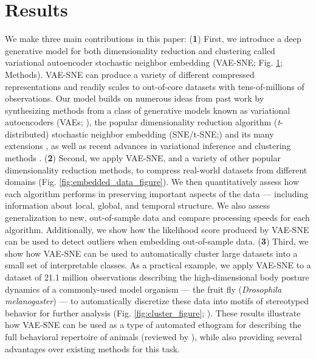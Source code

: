 \documentclass[11pt,a4paper,twoside]{book}
\begin{document}
\begin{doublespace}
\begin{figure}[!htb]
\label{fig:vaesne_figure} %

\end{figure}

\section{Results}
We make three main contributions in this paper: (\textbf{1}) First, we introduce a deep generative model for both dimensionality reduction and clustering called variational autoencoder stochastic neighbor embedding (VAE-SNE; Fig. \ref{fig:vaesne_figure}; Methods). VAE-SNE can produce a variety of different compressed representations and readily scales to out-of-core datasets with tens-of-millions of observations. Our model builds on numerous ideas from past work by synthesizing methods from a class of generative models known as variational autoencoders (VAEs; \citealt{kingma2013vae}), the popular dimensionality reduction algorithm (\textit{t}-distributed) stochastic neighbor embedding (SNE/t-SNE;\citealt{hinton2003stochastic, maaten2008tsne}) and its many extensions \citep{van2009ptsne, wang2016vmf, chien2017variational, ding2018scvis}, as well as recent advances in variational inference \citep{kingma2014semi, burda2015iwae, dilokthanakul2016gmvae, cremer2017reinterpreting, tomczak2017vae} and clustering methods \citep{todd2017systematic}. (\textbf{2}) Second, we apply VAE-SNE, and a variety of other popular dimensionality reduction methods, to compress real-world datasets from different domains (Fig. \ref{fig:embedded_data_figure}). We then quantitatively assess how each algorithm performs in preserving important aspects of the data --- including information about local, global, and temporal structure. We also assess generalization to new, out-of-sample data and compare processing speeds for each algorithm. Additionally, we show how the likelihood score produced by VAE-SNE can be used to detect outliers when embedding out-of-sample data. (\textbf{3}) Third, we show how VAE-SNE can be used to automatically cluster large datasets into a small set of interpretable classes. As a practical example, we apply VAE-SNE to a dataset of 21.1 million observations describing the high-dimensional body posture dynamics of a commonly-used model organism --- the fruit fly (\textit{Drosophila melanogaster}) --- to automatically discretize these data into motifs of stereotyped behavior for further analysis (Fig. \ref{fig:cluster_figure}; \citealt{berman2014mapping, pereira2019fast}). These results illustrate how VAE-SNE can be used as a type of automated ethogram for describing the full behavioral repertoire of animals (reviewed by \citealt{anderson2014toward, berman2018measuring, brown2018ethology, datta2019computational}), while also providing several advantages over existing methods for this task.



\end{doublespace}
\end{document}
